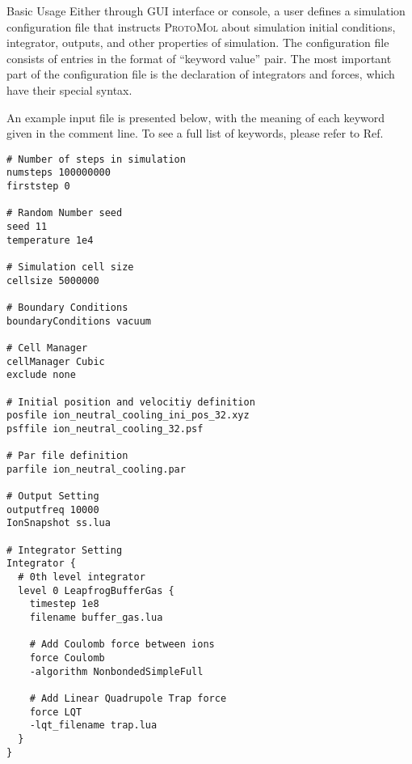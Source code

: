 \begin{section} {Basic Usage}
Either through GUI interface or console, a user defines a simulation configuration file that instructs \textsc{ProtoMol} about simulation initial conditions, integrator, outputs, and other properties of simulation. The configuration file consists of entries in the format of ``keyword value'' pair. The most important part of the configuration file is the declaration of integrators and forces, which have their special syntax. 

An example input file is presented below, with the meaning of each keyword given in the comment line. To see a full list of keywords, please refer to Ref.
\begin{lstlisting}[frame=single]
# Number of steps in simulation
numsteps 100000000
firststep 0

# Random Number seed
seed 11
temperature 1e4

# Simulation cell size
cellsize 5000000

# Boundary Conditions
boundaryConditions vacuum

# Cell Manager
cellManager Cubic
exclude none

# Initial position and velocitiy definition
posfile ion_neutral_cooling_ini_pos_32.xyz
psffile ion_neutral_cooling_32.psf

# Par file definition
parfile ion_neutral_cooling.par

# Output Setting
outputfreq 10000
IonSnapshot ss.lua

# Integrator Setting
Integrator {
  # 0th level integrator
  level 0 LeapfrogBufferGas {
    timestep 1e8
    filename buffer_gas.lua	
        
    # Add Coulomb force between ions
    force Coulomb 
    -algorithm NonbondedSimpleFull
        
    # Add Linear Quadrupole Trap force
    force LQT 
    -lqt_filename trap.lua
  }
}
\end{lstlisting}
\end{section}

